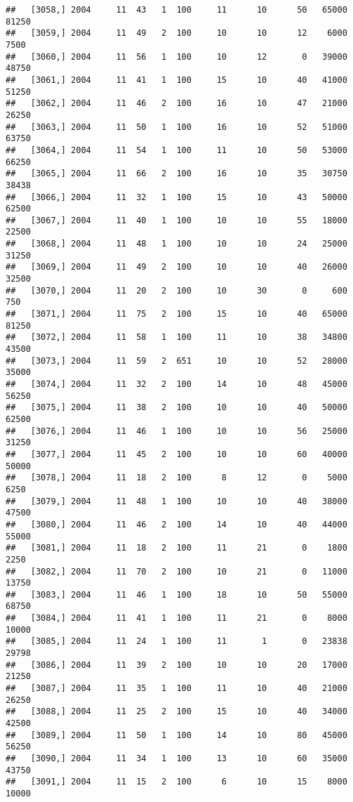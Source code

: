 \documentclass{article}\usepackage[]{graphicx}\usepackage[]{color}
\makeatletter
\newenvironment{kframe}{%
 \def\at@end@of@kframe{}%
 \ifinner\ifhmode%
  \def\at@end@of@kframe{\end{minipage}}%
  \begin{minipage}{\columnwidth}%
 \fi\fi%
 \def\FrameCommand##1{\hskip\@totalleftmargin \hskip-\fboxsep
 \colorbox{shadecolor}{##1}\hskip-\fboxsep
     \hskip-\linewidth \hskip-\@totalleftmargin \hskip\columnwidth}%
 \MakeFramed {\advance\hsize-\width
   \@totalleftmargin\z@ \linewidth\hsize
   \@setminipage}}%
 {\par\unskip\endMakeFramed%
 \at@end@of@kframe}
\newenvironment{knitrout}{}{} %
\makeatother
\begin{document}
\begin{knitrout}
\begin{kframe}
\begin{verbatim}
##   [3058,] 2004     11  43   1  100     11      10      50   65000   81250
##   [3059,] 2004     11  49   2  100     10      10      12    6000    7500
##   [3060,] 2004     11  56   1  100     10      12       0   39000   48750
##   [3061,] 2004     11  41   1  100     15      10      40   41000   51250
##   [3062,] 2004     11  46   2  100     16      10      47   21000   26250
##   [3063,] 2004     11  50   1  100     16      10      52   51000   63750
##   [3064,] 2004     11  54   1  100     11      10      50   53000   66250
##   [3065,] 2004     11  66   2  100     16      10      35   30750   38438
##   [3066,] 2004     11  32   1  100     15      10      43   50000   62500
##   [3067,] 2004     11  40   1  100     10      10      55   18000   22500
##   [3068,] 2004     11  48   1  100     10      10      24   25000   31250
##   [3069,] 2004     11  49   2  100     10      10      40   26000   32500
##   [3070,] 2004     11  20   2  100     10      30       0     600     750
##   [3071,] 2004     11  75   2  100     15      10      40   65000   81250
##   [3072,] 2004     11  58   1  100     11      10      38   34800   43500
##   [3073,] 2004     11  59   2  651     10      10      52   28000   35000
##   [3074,] 2004     11  32   2  100     14      10      48   45000   56250
##   [3075,] 2004     11  38   2  100     10      10      40   50000   62500
##   [3076,] 2004     11  46   1  100     10      10      56   25000   31250
##   [3077,] 2004     11  45   2  100     10      10      60   40000   50000
##   [3078,] 2004     11  18   2  100      8      12       0    5000    6250
##   [3079,] 2004     11  48   1  100     10      10      40   38000   47500
##   [3080,] 2004     11  46   2  100     14      10      40   44000   55000
##   [3081,] 2004     11  18   2  100     11      21       0    1800    2250
##   [3082,] 2004     11  70   2  100     10      21       0   11000   13750
##   [3083,] 2004     11  46   1  100     18      10      50   55000   68750
##   [3084,] 2004     11  41   1  100     11      21       0    8000   10000
##   [3085,] 2004     11  24   1  100     11       1       0   23838   29798
##   [3086,] 2004     11  39   2  100     10      10      20   17000   21250
##   [3087,] 2004     11  35   1  100     11      10      40   21000   26250
##   [3088,] 2004     11  25   2  100     15      10      40   34000   42500
##   [3089,] 2004     11  50   1  100     14      10      80   45000   56250
##   [3090,] 2004     11  34   1  100     13      10      60   35000   43750
##   [3091,] 2004     11  15   2  100      6      10      15    8000   10000

\end{verbatim}
\end{kframe}
\end{knitrout}
\end{document}
